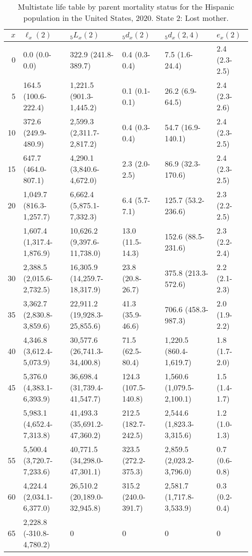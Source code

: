 \begin{table}

\caption{Multistate life table by parent mortality status for the Hispanic population in the United States, 2020. State 2: Lost mother.}
\centering
\begin{tabular}[t]{rlllll}
\toprule
$x$ & $\ell_x(2)$ & ${}_5 L_x(2)$ & ${}_5 d_x(2)$ & ${}_5 d_x(2,4)$ & $e_x(2)$\\
\midrule
0 & 0.0 (0.0-0.0) & 322.9 (241.8-389.7) & 0.4 (0.3-0.4) & 7.5 (1.6-24.4) & 2.4 (2.3-2.5)\\
5 & 164.5 (100.6-222.4) & 1,221.5 (901.3-1,445.2) & 0.1 (0.1-0.1) & 26.2 (6.9-64.5) & 2.4 (2.3-2.6)\\
10 & 372.6 (249.9-480.9) & 2,599.3 (2,311.7-2,817.2) & 0.4 (0.3-0.4) & 54.7 (16.9-140.1) & 2.4 (2.3-2.5)\\
15 & 647.7 (464.0-807.1) & 4,290.1 (3,840.6-4,672.0) & 2.3 (2.0-2.5) & 86.9 (32.3-170.6) & 2.4 (2.3-2.5)\\
20 & 1,049.7 (816.3-1,257.7) & 6,662.4 (5,875.1-7,332.3) & 6.4 (5.7-7.1) & 125.7 (53.2-236.6) & 2.3 (2.2-2.5)\\
\addlinespace
25 & 1,607.4 (1,317.4-1,876.9) & 10,626.2 (9,397.6-11,738.0) & 13.0 (11.5-14.3) & 152.6 (88.5-231.6) & 2.3 (2.2-2.4)\\
30 & 2,388.5 (2,015.6-2,732.5) & 16,305.9 (14,259.7-18,317.9) & 23.8 (20.8-26.7) & 375.8 (213.3-572.6) & 2.2 (2.1-2.3)\\
35 & 3,362.7 (2,830.8-3,859.6) & 22,911.2 (19,928.3-25,855.6) & 41.3 (35.9-46.6) & 706.6 (458.3-987.3) & 2.0 (1.9-2.2)\\
40 & 4,346.8 (3,612.4-5,073.9) & 30,577.6 (26,741.3-34,400.8) & 71.5 (62.5-80.4) & 1,220.5 (860.4-1,619.7) & 1.8 (1.7-2.0)\\
45 & 5,376.0 (4,383.1-6,393.9) & 36,698.4 (31,739.4-41,547.7) & 124.3 (107.5-140.8) & 1,560.6 (1,079.5-2,100.1) & 1.5 (1.4-1.7)\\
\addlinespace
50 & 5,983.1 (4,652.4-7,313.8) & 41,493.3 (35,691.2-47,360.2) & 212.5 (182.7-242.5) & 2,544.6 (1,823.3-3,315.6) & 1.2 (1.0-1.3)\\
55 & 5,500.4 (3,720.7-7,233.6) & 40,771.5 (34,298.0-47,301.1) & 323.5 (272.2-375.3) & 2,859.5 (2,023.2-3,796.0) & 0.7 (0.6-0.8)\\
60 & 4,224.4 (2,034.1-6,377.0) & 26,510.2 (20,189.0-32,945.8) & 315.2 (240.0-391.7) & 2,581.7 (1,717.8-3,533.9) & 0.3 (0.2-0.4)\\
65 & 2,228.8 (-310.8-4,780.2) & 0 & 0 & 0 & 0\\
\bottomrule
\end{tabular}
\end{table}